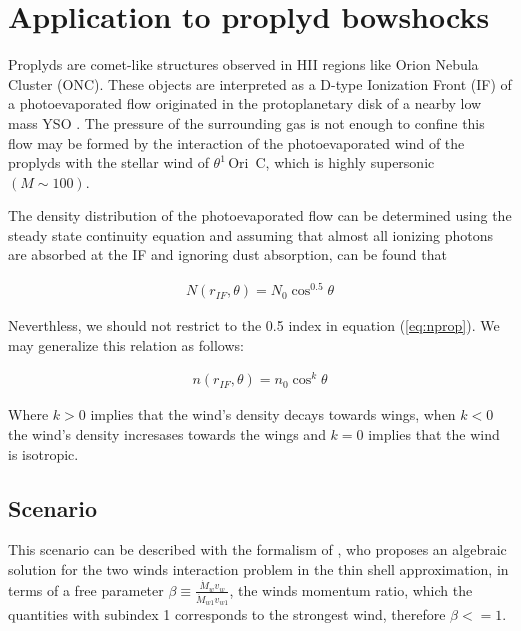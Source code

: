 \section{Application to proplyd bowshocks}
\label{sec:application}
\newcommand\thC{\(\theta^1\)\,Ori~C}
\newcommand\CRW{\citetalias{Canto:1996}}

Proplyds are comet-like structures observed in HII regions like Orion Nebula Cluster (ONC). 
These objects are interpreted as a D-type Ionization Front (IF) of a photoevaporated flow 
originated in the protoplanetary disk of a nearby low mass YSO \citep{Johnstone:1998}.
The pressure of the surrounding gas is not enough to confine this flow \citep{HA:1998}
may be formed by the interaction of the photoevaporated wind of the proplyds with the stellar wind of \thC{}, which is highly supersonic $(M \sim 100)$. 

The density distribution of the photoevaporated flow can be determined using the steady state continuity equation and assuming that almost all ionizing photons are absorbed at the IF 
\citep{HA:1998} and ignoring dust absorption, can be found that

\begin{align}
N(r_{IF},\theta) = N_0 \cos^{0.5}\theta
\label{eq:nprop}
\end{align}

Neverthless, we should not restrict to the 0.5 index in equation (\ref{eq:nprop}). We may generalize this relation as follows:

\begin{align}
n(r_{IF},\theta) = n_0 \cos^{k}\theta
\label{eq:ngen}
\end{align}

Where $k >0$ implies that the wind's density decays towards wings, when $k<0$ the wind's density incresases towards the wings and $k=0$ implies that the wind is isotropic.

\subsection{\CRW{} Scenario}
\label{sec:crw-scenario}
This scenario can be described with the formalism of
\citet[][hereafter \CRW{}]{Canto:1996}, who proposes an algebraic
solution for the two winds interaction problem in the thin shell
approximation, in terms of a free parameter
$\beta\equiv\frac{\dot{M}_wv_w}{\dot{M}_{w1}v_{w1}}$, the winds
momentum ratio, which the quantities with subindex 1 corresponds to
the strongest wind, therefore $\beta<=1$.

